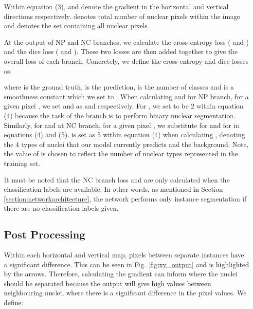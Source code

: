 \documentclass[journal]{IEEEtran}
\begin{document}
	
	\noindent Within equation (3),  and  denote the gradient in the horizontal  and vertical  directions respectively.  denotes total number of nuclear pixels within the image and  denotes the set containing all nuclear pixels.
	
	At the output of NP and NC branches, we calculate the cross-entropy loss ( and ) and the dice loss ( and ). These two losses are then added together to give the overall loss of each branch. Concretely, we define the cross entropy and dice losses as:
	
	
	\noindent where  is the ground truth,  is the prediction,  is the number of classes and  is a smoothness constant which we set to . When calculating  and  for NP branch, for a given pixel , we set  and  as  and  respectively. For , we set  to be 2 within equation (4) because the task of the branch is to perform binary nuclear segmentation. Similarly, for  and  at NC branch, for a given pixel , we substitute  for  and  for  in equations (4) and (5).  is set as 5 within equation (4) when calculating , denoting the 4 types of nuclei that our model currently predicts and the background. Note, the value of  is chosen to reflect the number of nuclear types represented in the training set. 
	
	It must be noted that the NC branch loss  and  are only calculated when the classification labels are available. In other words, as mentioned in Section \ref{section:networkarchitecture}, the network performs only instance segmentation if there are no classification labels given.

    \subsection{Post Processing}  \label{section:postprocessing}
Within each horizontal and vertical map, pixels between separate instances have a significant difference. This can be seen in Fig. \ref{fig:xy_output} and is highlighted by the arrows. Therefore, calculating the gradient can inform where the nuclei should be separated because the output will give high values between neighbouring nuclei, where there is a significant difference in the pixel values. We define:
	
\end{document}
